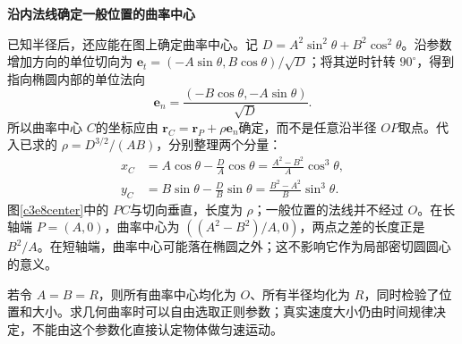 \begin{solution}
\par\medskip{}\noindent\textbf{沿内法线确定一般位置的曲率中心}\par\nobreak
已知半径后，还应能在图上确定曲率中心。记
$D=A^2\sin^2\theta+B^2\cos^2\theta$。沿参数增加方向的单位切向为
$\bm e_t=(-A\sin\theta,B\cos\theta)/\sqrt D$；将其逆时针转 $90^\circ$，得到指向椭圆内部的单位法向
\[\bm e_n=\frac{(-B\cos\theta,-A\sin\theta)}{\sqrt D}.\]
所以曲率中心 $C$的坐标应由 $\bm r_C=\bm r_P+\rho\bm e_n$确定，而不是任意沿半径 $OP$取点。代入已求的 $\rho=D^{3/2}/(AB)$，分别整理两个分量：
\begin{align*}
x_C&=A\cos\theta-\frac D A\cos\theta
 =\frac{A^2-B^2}{A}\cos^3\theta,\\
y_C&=B\sin\theta-\frac D B\sin\theta
 =\frac{B^2-A^2}{B}\sin^3\theta.
\end{align*}
图\ref{c3e8center}中的 $PC$与切向垂直，长度为 $\rho$；一般位置的法线并不经过 $O$。在长轴端 $P=(A,0)$，曲率中心为 $((A^2-B^2)/A,0)$，两点之差的长度正是 $B^2/A$。在短轴端，曲率中心可能落在椭圆之外；这不影响它作为局部密切圆圆心的意义。

若令 $A=B=R$，则所有曲率中心均化为 $O$、所有半径均化为 $R$，同时检验了位置和大小。求几何曲率时可以自由选取正则参数；真实速度大小仍由时间规律决定，不能由这个参数化直接认定物体做匀速运动。
\end{solution}

